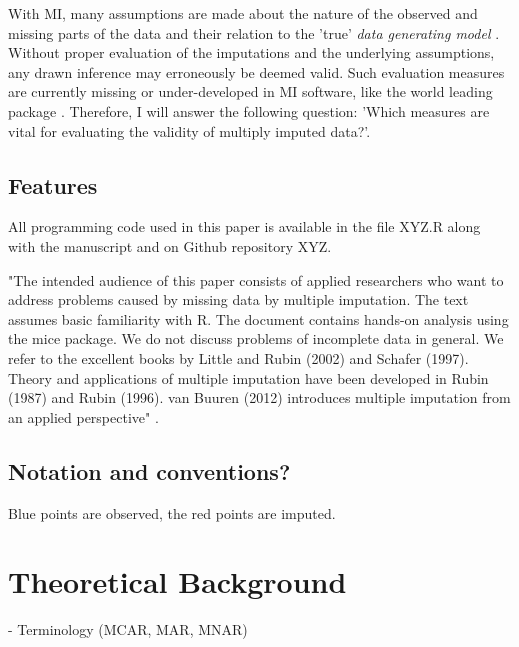 \documentclass[article]{jss}
\begin{document}
With MI, many assumptions are made about the nature of the observed and missing parts of the data and their relation to the 'true' \emph{data generating model} \citep{buur18}. Without proper evaluation of the imputations and the underlying assumptions, any drawn inference may erroneously be deemed valid. Such evaluation measures are currently missing or under-developed in MI software, like the world leading  package  \citep{mice11}. Therefore, I will answer the following question: 'Which measures are vital for evaluating the validity of multiply imputed data?'.

\subsection{Features} \label{sec:features}

All programming code used in this paper is available in the file XYZ.R along with the manuscript and on Github repository XYZ. 

"The intended audience of this paper consists of applied researchers who want to address problems caused by missing data by multiple imputation. The text assumes basic familiarity with R. The document contains hands-on analysis using the mice package. We do not discuss problems of incomplete data in general. We refer to the excellent books by Little and Rubin (2002) and Schafer (1997). Theory and applications of multiple imputation have been developed in Rubin (1987) and Rubin (1996). van Buuren (2012) introduces multiple imputation from an applied perspective" \cite[p.~4]{mice}.

\subsection{Notation and conventions?} \label{sec:notation}


Blue points are observed, the red points are imputed. 



\section{Theoretical Background} \label{sec:background}

- Terminology (MCAR, MAR, MNAR)
\end{document}
